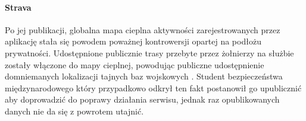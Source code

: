 \paragraph{Strava}
Po jej publikacji, globalna mapa cieplna aktywności zarejestrowanych przez aplikację  stała się powodem poważnej kontrowersji opartej na podłożu prywatności. Udostępnione publicznie trasy przebyte przez żołnierzy na służbie zostały włączone do mapy cieplnej, powodując publiczne udostępnienie domniemanych lokalizacji tajnych baz wojskowych \cite{Strava_Military_Bases}. Student bezpieczeństwa międzynarodowego który przypadkowo odkrył ten fakt postanowił go upublicznić aby doprowadzić do poprawy działania serwisu, jednak raz opublikowanych danych nie da się z powrotem utajnić.


